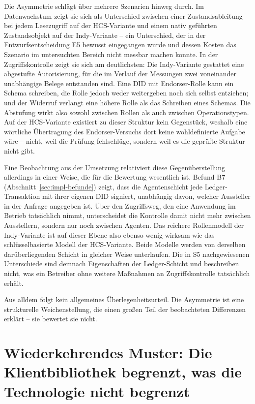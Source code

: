 Die Asymmetrie schlägt über mehrere Szenarien hinweg durch. Im Datenwachstum zeigt sie sich als Unterschied zwischen einer Zustandsableitung bei jedem Lesezugriff auf der HCS-Variante und einem nativ geführten Zustandsobjekt auf der Indy-Variante -- ein Unterschied, der in der Entwurfsentscheidung E5 bewusst eingegangen wurde und dessen Kosten das Szenario im untersuchten Bereich nicht messbar machen konnte. In der Zugriffskontrolle zeigt sie sich am deutlichsten: Die Indy-Variante gestattet eine abgestufte Autorisierung, für die im Verlauf der Messungen zwei voneinander unabhängige Belege entstanden sind. Eine DID mit Endorser-Rolle kann ein Schema schreiben, die Rolle jedoch weder weitergeben noch sich selbst entziehen; und der Widerruf verlangt eine höhere Rolle als das Schreiben eines Schemas. Die Abstufung wirkt also sowohl zwischen Rollen als auch zwischen Operationstypen. Auf der HCS-Variante existiert zu dieser Struktur kein Gegenstück, weshalb eine wörtliche Übertragung des Endorser-Versuchs dort keine wohldefinierte Aufgabe wäre -- nicht, weil die Prüfung fehlschlüge, sondern weil es die geprüfte Struktur nicht gibt.

Eine Beobachtung aus der Umsetzung relativiert diese Gegenüberstellung allerdings in einer Weise, die für die Bewertung wesentlich ist. Befund B7 (Abschnitt~\ref{sec:impl-befunde}) zeigt, dass die Agentenschicht jede Ledger-Transaktion mit ihrer eigenen DID signiert, unabhängig davon, welcher Aussteller in der Anfrage angegeben ist. Über den Zugriffsweg, den eine Anwendung im Betrieb tatsächlich nimmt, unterscheidet die Kontrolle damit nicht mehr zwischen Ausstellern, sondern nur noch zwischen Agenten. Das reichere Rollenmodell der Indy-Variante ist auf dieser Ebene also ebenso wenig wirksam wie das schlüsselbasierte Modell der HCS-Variante. Beide Modelle werden von derselben darüberliegenden Schicht in gleicher Weise unterlaufen. Die in S5 nachgewiesenen Unterschiede sind demnach Eigenschaften der Ledger-Schicht und beschreiben nicht, was ein Betreiber ohne weitere Maßnahmen an Zugriffskontrolle tatsächlich erhält.

Aus alldem folgt kein allgemeines Überlegenheitsurteil. Die Asymmetrie ist eine strukturelle Weichenstellung, die einen großen Teil der beobachteten Differenzen erklärt -- sie bewertet sie nicht.

\section{Wiederkehrendes Muster: Die Klientbibliothek begrenzt, was die Technologie nicht begrenzt}
\label{sec:discussion-bibliotheksgrenzen}

